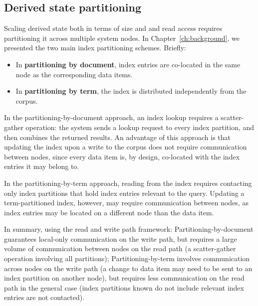 
\subsection{Derived state partitioning}
\label{sec:index_partitioning_design_space}


Scaling derived state both in terms of size and and read access requires partitioning it across multiple system nodes.
In Chapter~\ref{ch:background}, we presented the two main index partitioning schemes.
Briefly:

\begin{itemize}
  \item In \textbf{partitioning by document}, index entries are co-located in the same node as the corresponding
  data items.
  \item In \textbf{partitioning by term}, the index is distributed independently from the corpus.
\end{itemize}

In the partitioning-by-document approach, an index lookup requires a scatter-gather operation:
the system sends a lookup request to every index partition, and then combines the returned results.
An advantage of this approach is that updating the index upon a write to the corpus does not require communication between nodes,
since every data item is, by design, co-located with the index entries it may belong to.

In the partitioning-by-term approach, reading from the index requires contacting only index partitions that hold index entries
relevant to the query.
Updating a term-partitioned index, however, may require communication between nodes,
as index entries may be located on a different node than the data item.

In summary, using the read and write path framework:
Partitioning-by-document guarantees local-only communication on the write path, but requires a large volume of
communication between nodes on the read path (a scatter-gather operation involving all partitions);
Partitioning-by-term involves communication across nodes on the write path (a change to data item may need to be sent to
an index partition on another node),
but requires less communication on the read path in the general case
(index partitions known do not include relevant index entries are not contacted).

